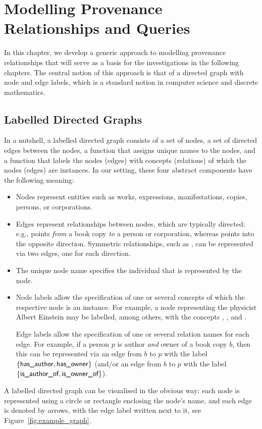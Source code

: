 
\chapter{Modelling Provenance Relationships and Queries}

In this chapter, we develop a generic approach to modelling provenance relationships
that will serve as a basis for the investigations in the following chapters.
The central notion of this approach is that of a directed graph with node and edge labels,
which is a standard notion in computer science and discrete mathematics.

\section{Labelled Directed Graphs}

In a nutshell, a labelled directed graph consists of a set of nodes, a set of directed edges between
the nodes, a function that assigns unique names to the nodes,
and a function that labels the nodes (edges) with concepts (relations)
of which the nodes (edges) are instances.
In our setting, these four abstract components have the following meaning:
%
\begin{itemize}
  \item 
    Nodes represent entities such as works, expressions, manifestations, copies,
    persons, or corporations.
  \item 
    Edges represent relationships between nodes, which are typically directed:
    e.g.,  points \emph{from} a book copy \emph{to} a person or corporation,
    whereas  points into the opposite direction.
    Symmetric relationships, such as ,
    can be represented via two edges, one for each direction.
  \item 
    The unique node name specifies the individual that is represented by the node.
  \item 
    Node labels allow the specification of one or several concepts
    of which the respective node is an instance.
    For example, a node representing the physicist Albert Einstein
    may be labelled, among others, with the concepts , ,
    and .

    Edge labels allow the specification of one or several relation names for each edge.
    For example, if a person $p$ is author \emph{and} owner of a book copy $b$,
    then this can be represented via an edge from $b$ to $p$ with the label
    $\{\textsf{has\_author},\textsf{has\_owner}\}$
    (and/or an edge from $b$ to $p$ with the label $\{\textsf{is\_author\_of},\textsf{is\_owner\_of}\}$).
\end{itemize}
%
A labelled directed graph can be visualised in the obvious way:
each node is represented using a circle or rectangle
enclosing the node's name,
and each edge is denoted by arrows, with the edge label written next to it,
see Figure~\ref{fig:example_graph}.

